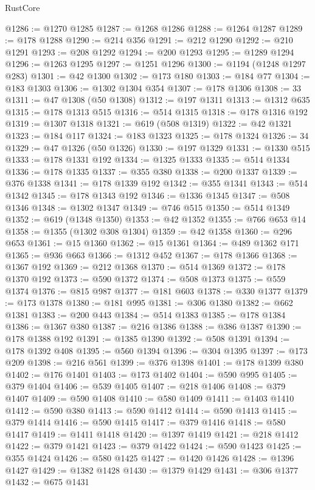 \begin{lexlean}{RustCore}
\begin{coremodule}
@1286 := @1270 @1285
@1287 := @1268 @1286
@1288 := @1264 @1287
@1289 := @178 @1288
@1290 := @214 @356
@1291 := @212 @1290
@1292 := @210 @1291
@1293 := @208 @1292
@1294 := @200 @1293
@1295 := @1289 @1294
@1296 := @1263 @1295
@1297 := @1251 @1296
@1300 := @1194 (@1248 @1297 @283)
@1301 := @42 @1300
@1302 := @173 @180
@1303 := @184 @77
@1304 := @183 @1303
@1306 := @1302 @1304 @354
@1307 := @178 @1306
@1308 := 33
@1311 := @47 @1308 (@50 @1308)
@1312 := @197 @1311
@1313 := @1312 @635
@1315 := @178 @1313 @515
@1316 := @514 @1315
@1318 := @178 @1316 @192
@1319 := @1307 @1318
@1321 := @619 (@508 @1319)
@1322 := @42 @1321
@1323 := @184 @117
@1324 := @183 @1323
@1325 := @178 @1324
@1326 := 34
@1329 := @47 @1326 (@50 @1326)
@1330 := @197 @1329
@1331 := @1330 @515
@1333 := @178 @1331 @192
@1334 := @1325 @1333
@1335 := @514 @1334
@1336 := @178 @1335
@1337 := @355 @380
@1338 := @200 @1337
@1339 := @376 @1338
@1341 := @178 @1339 @192
@1342 := @355 @1341
@1343 := @514 @1342
@1345 := @178 @1343 @192
@1346 := @1336 @1345
@1347 := @508 @1346
@1348 := @1302 @1347
@1349 := @746 @515
@1350 := @514 @1349
@1352 := @619 (@1348 @1350)
@1353 := @42 @1352
@1355 := @766 @653 @14
@1358 := @1355 (@1302 @308 @1304)
@1359 := @42 @1358
@1360 := @296 @653
@1361 := @15 @1360
@1362 := @15 @1361
@1364 := @489 @1362 @171
@1365 := @936 @663
@1366 := @1312 @452
@1367 := @178 @1366
@1368 := @1367 @192
@1369 := @212 @1368
@1370 := @514 @1369
@1372 := @178 @1370 @192
@1373 := @590 @1372
@1374 := @508 @1373
@1375 := @559 @1374
@1376 := @815 @987
@1377 := @181 @603
@1378 := @330 @1377
@1379 := @173 @1378
@1380 := @181 @995
@1381 := @306 @1380
@1382 := @662 @1381
@1383 := @200 @443
@1384 := @514 @1383
@1385 := @178 @1384
@1386 := @1367 @380
@1387 := @216 @1386
@1388 := @386 @1387
@1390 := @178 @1388 @192
@1391 := @1385 @1390
@1392 := @508 @1391
@1394 := @178 @1392 @408
@1395 := @560 @1394
@1396 := @304 @1395
@1397 := @173 @209
@1398 := @216 @561
@1399 := @376 @1398
@1401 := @178 @1399 @380
@1402 := @176 @1401
@1403 := @173 @1402
@1404 := @590 @995
@1405 := @379 @1404
@1406 := @539 @1405
@1407 := @218 @1406
@1408 := @379 @1407
@1409 := @590 @1408
@1410 := @580 @1409
@1411 := @1403 @1410
@1412 := @590 @380
@1413 := @590 @1412
@1414 := @590 @1413
@1415 := @379 @1414
@1416 := @590 @1415
@1417 := @379 @1416
@1418 := @580 @1417
@1419 := @1411 @1418
@1420 := @1397 @1419
@1421 := @218 @1412
@1422 := @379 @1421
@1423 := @379 @1422
@1424 := @590 @1423
@1425 := @355 @1424
@1426 := @580 @1425
@1427 := @1420 @1426
@1428 := @1396 @1427
@1429 := @1382 @1428
@1430 := @1379 @1429
@1431 := @306 @1377
@1432 := @675 @1431

\end{coremodule}
\end{lexlean}
